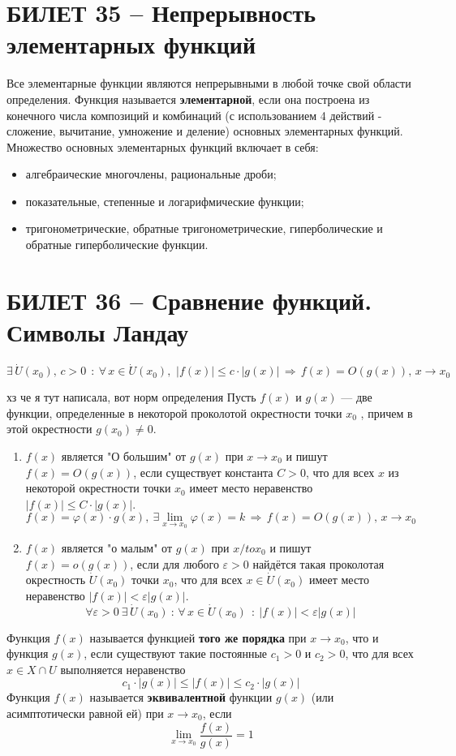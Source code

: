\documentclass{article}
\begin{document}
\section{БИЛЕТ 35 -- Непрерывность элементарных функций}
Все элементарные функции являются непрерывными в любой точке свой области определения. 
\newline
Функция называется \textbf{элементарной}, если она построена из конечного числа композиций и комбинаций (с использованием 4 действий - сложение, вычитание, умножение и деление) основных элементарных функций. 
\newline
Множество основных элементарных функций включает в себя: 
\begin{itemize}
    \item алгебраические многочлены, рациональные дроби;
    \item показательные, степенные и логарифмические функции;
    \item тригонометрические, обратные тригонометрические, гиперболические и обратные гиперболические функции.
    
\end{itemize}
\newpage
\section{БИЛЕТ 36 -- Сравнение функций. Символы Ландау}
$$ \exists\, \dot{U}(x_0),\, c>0\:\::\:\forall\, x\in \dot{U}(x_0),\,\,|f(x)|\leqslant c\cdot |g(x)|\,\Rightarrow\, f(x)=O(g(x)),\,x\to x_0$$

хз че я тут написала, вот норм определения
\newline
Пусть $f(x)$ и $g(x)$ — две функции, определенные в некоторой проколотой окрестности точки $x_0$ , причем в этой окрестности $g(x_0)\neq 0$.
\begin{enumerate}
    \item $f(x)$ является "О большим"  от $g(x)$ при $x\to x_0$ и пишут $f(x)=O(g(x))$, если существует константа $C>0$, что для всех $x$ из некоторой окрестности точки $x_0$ имеет место неравенство $|f(x)|\leqslant C\cdot|g(x)|$.
    $$ f(x)=\varphi(x)\cdot g(x),\: \exists\lim_{x\to x_0} \varphi(x)=k\,\Rightarrow\, f(x)=O(g(x)),\,x\to x_0 $$
    \item $f(x)$ является "о малым"  от $g(x)$ при $x/to x_0$ и пишут $f(x)=o(g(x))$, если для любого $\varepsilon>0$ найдётся такая проколотая окрестность $\dot{U}(x_0)$ точки $x_0$, что для всех $x\in\dot{U}(x_0)$ имеет место неравенство $|f(x)|<\varepsilon|g(x)|$.
    $$ \forall \varepsilon>0\:\exists\,\dot{U}(x_0)\::\,\forall\, x\in \dot{U}(x_0)\:\::\: |f(x)|<\varepsilon|g(x)| $$
\end{enumerate}
Функция $f(x)$ называется функцией \textbf{того же порядка} при $x\to x_0$, что и функция $g(x)$, если существуют такие постоянные $c_1 > 0$ и $c_2 > 0$, что для всех $x \in X\cap U$ выполняется неравенство
$$ c_1\cdot|g(x)|\leqslant|f(x)|\leqslant c_2\cdot|g(x)| $$
Функция $f(x)$ называется \textbf{эквивалентной} функции $g(x)$ (или асимптотически равной ей) при $x\to x_0$, если
$$ \lim_{x\to x_0} \frac{f(x)}{g(x)}=1 $$
\newpage
\end{document}
